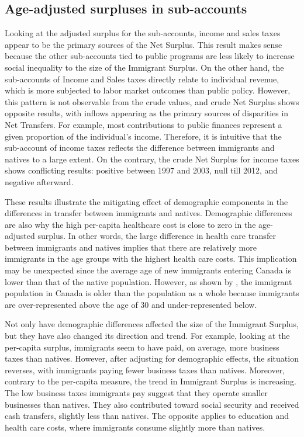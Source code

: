\subsection{Age-adjusted surpluses in sub-accounts}

Looking at the adjusted surplus for the sub-accounts, income and sales taxes appear to be the primary sources of the Net Surplus.
This result makes sense because the other sub-accounts tied to public programs are less likely to increase social inequality to the size of the Immigrant Surplus.
On the other hand, the sub-accounts of Income and Sales taxes directly relate to individual revenue, which is more subjected to labor market outcomes than public policy.
However, this pattern is not observable from the crude values, and crude Net Surplus shows opposite results, with inflows appearing as the primary sources of disparities in Net Transfers.
For example, most contributions to public finances represent a given proportion of the individual's income.
Therefore, it is intuitive that the sub-account of income taxes reflects the difference between immigrants and natives to a large extent.
On the contrary, the crude Net Surplus for income taxes shows conflicting results: positive between 1997 and 2003, null till 2012, and negative afterward.

\vspace{0.7em}\par
These results illustrate the mitigating effect of demographic components in the differences in transfer between immigrants and natives.
Demographic differences are also why the high per-capita healthcare cost is close to zero in the age-adjusted surplus.
In other words, the large difference in health care transfer between immigrants and natives implies that there are relatively more immigrants in the age groups with the highest health care costs.
This implication may be unexpected since the average age of new immigrants entering Canada is lower than that of the native population.
However, as shown by \citet[p~244]{Malenfant.2011}, the immigrant population in Canada is older than the population as a whole because immigrants are over-represented above the age of 30 and under-represented below.

\vspace{0.7em}\par
Not only have demographic differences affected the size of the Immigrant Surplus, but they have also changed its direction and trend.
For example, looking at the per-capita surplus, immigrants seem to have paid, on average, more business taxes than natives.
However, after adjusting for demographic effects, the situation reverses, with immigrants paying fewer business taxes than natives. Moreover, contrary to the per-capita measure, the trend in Immigrant Surplus is increasing.
The low business taxes immigrants pay suggest that they operate smaller businesses than natives.
They also contributed toward social security and received cash transfers, slightly less than natives.
The opposite applies to education and health care costs, where immigrants consume slightly more than natives.


